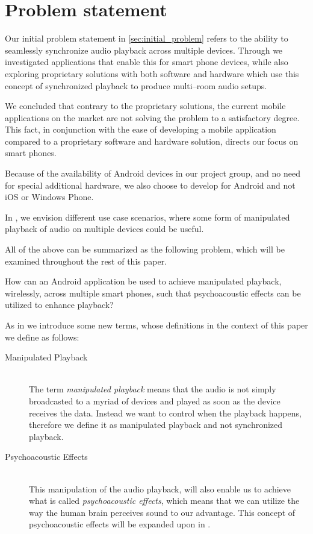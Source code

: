 \chapter{Problem statement}\label{cha:problem_statement}
Our initial problem statement in \cref{sec:initial_problem} refers to the ability to seamlessly synchronize audio playback across multiple devices.
Through  we investigated applications that enable this for smart phone devices, while also exploring proprietary solutions with both software and hardware which use this concept of synchronized playback to produce multi--room audio setups.

We concluded that contrary to the proprietary solutions, the current mobile applications on the market are not solving the problem to a satisfactory degree.
This fact, in conjunction with the ease of developing a mobile application compared to a proprietary software and hardware solution, directs our focus on smart phones.

Because of the availability of Android devices in our project group, and no need for special additional hardware, we also choose to develop for Android and not iOS or Windows Phone.

In , we envision different use case scenarios, where some form of manipulated playback of audio on multiple devices could be useful.

\bigskip
All of the above can be summarized as the following problem, which will be examined throughout the rest of this paper.

\begin{problemstatement}
    How can an Android application be used to achieve manipulated playback, wirelessly, across multiple smart phones, such that psychoacoustic effects can be utilized to enhance playback?
\end{problemstatement}

\bigskip\noindent
As in  we introduce some new terms, whose definitions in the context of this paper we define as follows:

\begin{description}
    \item[Manipulated Playback] \hfill \\
        The term \textit{manipulated playback} means that the audio is not simply broadcasted to a myriad of devices and played as soon as the device receives the data.
        Instead we want to control when the playback happens, therefore we define it as manipulated playback and not synchronized playback.
    \item[Psychoacoustic Effects] \hfill \\
        This manipulation of the audio playback, will also enable us to achieve what is called \textit{psychoacoustic effects}, which means that we can utilize the way the human brain perceives sound to our advantage.
        This concept of psychoacoustic effects will be expanded upon in .
\end{description}
